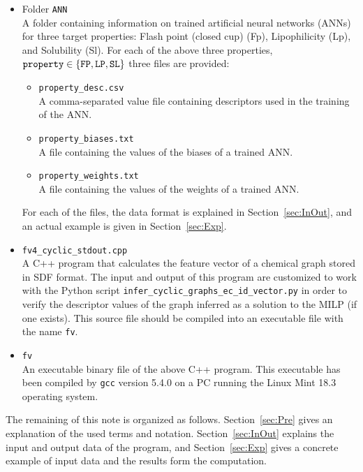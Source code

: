 \documentclass[11pt, titlepage, dvipdfmx, twoside]{article}
\begin{document}
\begin{itemize}
\begin{itemize}
\item Folder {\tt ANN}\\
A folder containing information on trained artificial neural networks (ANNs) for three target properties:
Flash point (closed cup) (Fp), Lipophilicity (Lp), and Solubility (Sl).
For each of the above three properties, ${\tt property} \in \{{\tt FP, LP, SL}\}$ three files are provided:
%
\begin{itemize}
\item {\tt property\_desc.csv}\\
A comma-separated value file containing descriptors
used in the training of the ANN.

\item {\tt property\_biases.txt}\\
A file containing the values of the biases of a trained ANN.

\item {\tt property\_weights.txt}\\
A file containing the values of the weights of a trained ANN.
\end{itemize}
%
For each of the files, the data format is explained in Section~\ref{sec:InOut},
and an actual example is given in Section~\ref{sec:Exp}.

\item {\tt fv4\_cyclic\_stdout.cpp}\\
A C++ program that calculates the feature vector of 
a chemical graph stored in SDF format.
The input and output of this program are customized to work with 
the Python script {\tt infer\_cyclic\_graphs\_ec\_id\_vector.py}
in order to verify the descriptor values
of the graph inferred as a solution to the MILP (if one exists).
This source file should be compiled into an executable file
with the name {\tt fv}.

\item {\tt fv}\\
An executable binary file of the above C++ program.
This executable has been compiled 
by {\tt gcc} version 5.4.0
on a PC running the Linux Mint 18.3 operating system.
%
\end{itemize}
\end{itemize}



The remaining of this note is organized as follows.
Section~\ref{sec:Pre} gives an explanation 
of the used terms and notation.
%
Section~\ref{sec:InOut} explains the 
input and output data of the program,
and Section~\ref{sec:Exp} gives a concrete
example of input data and the results form the computation.
\end{document}
